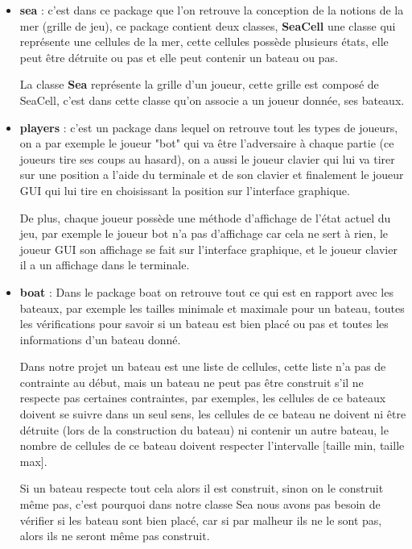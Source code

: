 \documentclass[12pt]{article}
\begin{document}
\begin{itemize}

\item \textbf{sea} : c'est dans ce package que l'on retrouve la conception de la notions de la mer (grille de jeu), ce package contient deux classes, \textbf{SeaCell} une classe qui représente une cellules de la mer, cette cellules possède plusieurs états, elle peut être détruite ou pas et elle peut contenir un bateau ou pas.

La classe \textbf{Sea} représente la grille d'un joueur, cette grille est composé de SeaCell, c'est dans cette classe qu'on associe a un joueur donnée, ses bateaux.

\item \textbf{players} : c'est un package dans lequel on retrouve tout les types de joueurs, on a par exemple le joueur "bot" qui va être l'adversaire à chaque partie (ce joueurs tire ses coups au hasard), on a aussi le joueur clavier qui lui va tirer sur une position a l'aide du terminale et de son clavier et finalement le joueur GUI qui lui tire en choisissant la position sur l'interface graphique.

De plus, chaque joueur possède une méthode d'affichage de l'état actuel du jeu, par exemple le joueur bot n'a pas d'affichage car cela ne sert à rien, le joueur GUI son affichage se fait sur l'interface graphique, et le joueur clavier il a un affichage dans le terminale.

\item \textbf{boat} : Dans le package boat on retrouve tout ce qui est en rapport avec les bateaux, par exemple les tailles minimale et maximale pour un bateau, toutes les vérifications pour savoir si un bateau est bien placé ou pas et toutes les informations d'un bateau donné.

Dans notre projet un bateau est une liste de cellules, cette liste n'a pas de contrainte au début, mais un bateau ne peut pas être construit s'il ne respecte pas certaines contraintes, par exemples, les cellules de ce bateaux doivent se suivre dans un seul sens, les cellules de ce bateau ne doivent ni être détruite (lors de la construction du bateau) ni contenir un autre bateau, le nombre de cellules de ce bateau doivent respecter l'intervalle [taille min, taille max].

Si un bateau respecte tout cela alors il est construit, sinon on le construit même pas, c'est pourquoi dans notre classe Sea nous avons pas besoin de vérifier si les bateau sont bien placé, car si par malheur ils ne le sont pas, alors ils ne seront même pas construit.


\end{itemize}
\end{document}
